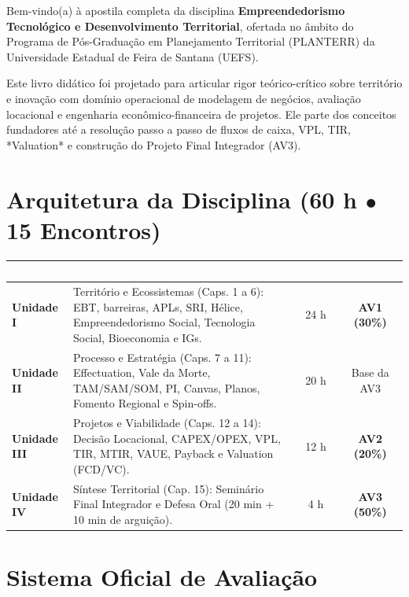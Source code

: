 Bem-vindo(a) à apostila completa da disciplina \textbf{Empreendedorismo Tecnológico e Desenvolvimento Territorial}, ofertada no âmbito do Programa de Pós-Graduação em Planejamento Territorial (PLANTERR) da Universidade Estadual de Feira de Santana (UEFS).

Este livro didático foi projetado para articular rigor teórico-crítico sobre território e inovação com domínio operacional de modelagem de negócios, avaliação locacional e engenharia econômico-financeira de projetos. Ele parte dos conceitos fundadores até a resolução passo a passo de fluxos de caixa, VPL, TIR, *Valuation* e construção do Projeto Final Integrador (AV3).

\section*{Arquitetura da Disciplina (60 h $\bullet$ 15 Encontros)}

\begin{center}
\renewcommand{\arraystretch}{1.24}
\begin{tabularx}{\textwidth}{@{}l >{\raggedright\arraybackslash}X c c@{}}
  \toprule
  \rowcolor{etIndigo}
  \textcolor{white}{\bfseries Unidade} & \textcolor{white}{\bfseries Eixo Temático e Capítulos} & \textcolor{white}{\bfseries Carga} & \textcolor{white}{\bfseries Avaliação} \\
  \midrule
  \textbf{Unidade I} & Território e Ecossistemas (Caps. 1 a 6): EBT, barreiras, APLs, SRI, Hélice, Empreendedorismo Social, Tecnologia Social, Bioeconomia e IGs. & 24 h & \textbf{AV1 (30\%)} \\
  \rowcolor{bgTeal}
  \textbf{Unidade II} & Processo e Estratégia (Caps. 7 a 11): Effectuation, Vale da Morte, TAM/SAM/SOM, PI, Canvas, Planos, Fomento Regional e Spin-offs. & 20 h & Base da AV3 \\
  \textbf{Unidade III} & Projetos e Viabilidade (Caps. 12 a 14): Decisão Locacional, CAPEX/OPEX, VPL, TIR, MTIR, VAUE, Payback e Valuation (FCD/VC). & 12 h & \textbf{AV2 (20\%)} \\
  \rowcolor{bgAmber}
  \textbf{Unidade IV} & Síntese Territorial (Cap. 15): Seminário Final Integrador e Defesa Oral (20 min + 10 min de arguição). & 4 h & \textbf{AV3 (50\%)} \\
  \bottomrule
\end{tabularx}
\end{center}

\section*{Sistema Oficial de Avaliação}

